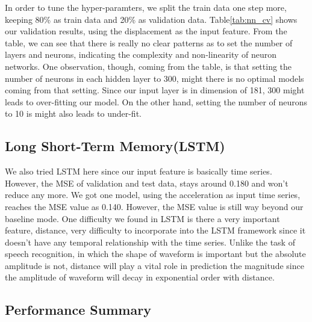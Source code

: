 \documentclass{article} %
\begin{document}
In order to tune the hyper-paramters, we split the train data one step more, keeping 80\% as train data and 20\% as validation data. Table\ref{tab:nn_cv} shows our validation results, using the displacement as the input feature. From the table, we can see that there is really no clear patterns as to set the number of layers and neurons, indicating the complexity and non-linearity of neuron networks. One observation, though, coming from the table, is that setting the number of neurons in each hidden layer to 300, might there is no optimal models coming from that setting. Since our input layer is in dimension of 181, 300 might leads to over-fitting our model.  On the other hand, setting the number of neurons to 10 is might also leads to under-fit.

\subsection{Long Short-Term Memory(LSTM)}
We also tried LSTM here since our input feature is basically time series. However, the MSE of validation and test data, stays around 0.180 and won't reduce any more. We got one model, using the acceleration as input time series, reaches the MSE value as 0.140. However, the MSE value is still way beyond our baseline mode. One difficulty we found in LSTM is there a very important feature, distance, very difficulty to incorporate into the LSTM framework since it doesn't have any temporal relationship with the time series. Unlike the task of speech recognition, in which the shape of waveform is important but the absolute amplitude is not, distance will play a vital role in prediction the magnitude since the amplitude of  waveform will decay in exponential order with distance.


\subsection{Performance Summary}
\end{document}
